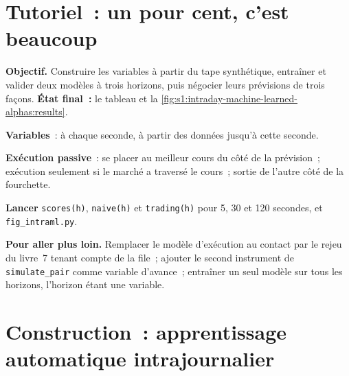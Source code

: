 \section{Tutoriel~: un pour cent, c'est beaucoup}\label{tut:s1:intraday-machine-learned-alphas:tut}

\begin{tutorial}
\textbf{Objectif.} Construire les variables à partir du tape synthétique, entraîner et valider deux modèles à trois horizons, puis négocier leurs prévisions de trois façons. \textbf{État final~:}
le tableau et la \cref{fig:s1:intraday-machine-learned-alphas:results}.
\begin{tutsteps}
\item \textbf{Variables}~: à chaque seconde, à partir des données jusqu'à cette seconde.
\label{lst:s1:intraday-machine-learned-alphas:features}
\item \textbf{Exécution passive}~: se placer au meilleur cours du côté de la prévision~; exécution seulement si le marché a traversé le cours~; sortie de l'autre côté de la fourchette.
\label{lst:s1:intraday-machine-learned-alphas:passive}
\item \textbf{Lancer} \texttt{scores(h)}, \texttt{naive(h)} et \texttt{trading(h)} pour 5, 30 et 120 secondes, et \texttt{fig\_intraml.py}.
\end{tutsteps}
\textbf{Pour aller plus loin.} Remplacer le modèle d'exécution au contact par le rejeu du livre~7 tenant compte de la file~; ajouter le second instrument de \texttt{simulate\_pair} comme variable
d'avance~; entraîner un seul modèle sur tous les horizons, l'horizon étant une variable.
\end{tutorial}

\section{Construction~: apprentissage automatique intrajournalier}\label{bld:s1:intraday-machine-learned-alphas:intraml}

